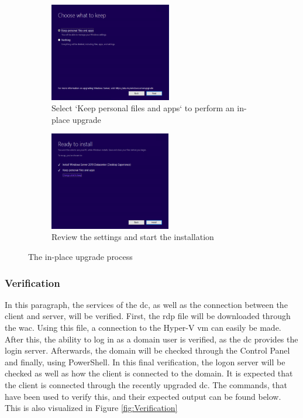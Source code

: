 \begin{figure}[h]\ContinuedFloat
	\begin{subfigure}{0.5\textwidth}
		\captionsetup{width=0.8\linewidth}
		\includegraphics[width=0.9\linewidth,height=4.3cm]{img/Methodologie/InPlace4.png} 
		\centering
		\caption{Select `Keep personal files and apps` to perform an in-place upgrade}
	\end{subfigure}
	\begin{subfigure}{0.5\textwidth}
		\captionsetup{width=0.8\linewidth}
		\includegraphics[width=0.9\linewidth,height=4.3cm]{img/Methodologie/InPlace5.png}
		\centering
		\caption{Review the settings and start the installation}
	\end{subfigure}
	\caption[In-place upgrade]{The in-place upgrade process}
	\label{fig:Inplace}
\end{figure}

\subsubsection{Verification}
In this paragraph, the services of the \acrshort{dc}, as well as the connection between the client and server, will be verified. 
First, the \acrfull{rdp} file will be downloaded through the \acrlong{wac}. 
Using this file, a connection to the Hyper-V \acrshort{vm} can easily be made. 
After this, the ability to log in as a domain user is verified, as the \acrshort{dc} provides the login server. 
Afterwards, the domain will be checked through the Control Panel and finally, using PowerShell. 
In this final verification, the logon server will be checked as well as how the client is connected to the domain. 
It is expected that the client is connected through the recently upgraded \acrshort{dc}.
The commands, that have been used to verify this, and their expected output can be found below. 
This is also visualized in Figure \ref{fig:Verification}

